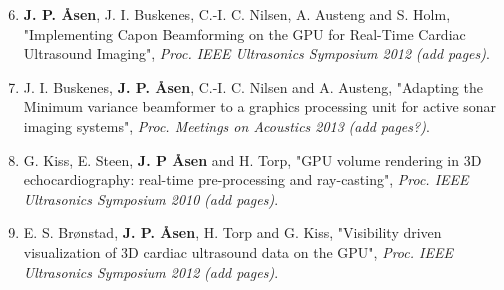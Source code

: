 \documentclass[10pt,b5paper,twoside]{book}
\newcommand\todo[1]{{\textit{\color{red}(#1)}}}
\begin{document}
\begin{enumerate}[VI]
\setcounter{enumi}{5}
\renewcommand\labelenumi{\bfseries\theenumi}

	\item \textbf{J. P. \AA{}sen}, J. I. Buskenes, C.-I. C. Nilsen, A. Austeng and S. Holm, "Implementing Capon Beamforming on the GPU for Real-Time Cardiac Ultrasound Imaging", {\it Proc. IEEE Ultrasonics Symposium 2012} \todo{add pages}.

	\item J. I. Buskenes, \textbf{J. P. \AA{}sen}, C.-I. C. Nilsen and A. Austeng, "Adapting the Minimum variance beamformer to a graphics processing unit for active sonar imaging systems", {\it Proc. Meetings on Acoustics 2013} \todo{add pages?}.
	
	\item G. Kiss, E. Steen, \textbf{J. P \AA{}sen} and H. Torp, "GPU volume rendering in 3D echocardiography: real-time pre-processing and ray-casting", {\it Proc. IEEE Ultrasonics Symposium 2010} \todo{add pages}.


	\item E. S. Br\o{}nstad, \textbf{J. P. \AA{}sen}, H. Torp and G. Kiss, "Visibility driven visualization of 3D cardiac ultrasound data on the GPU", {\it Proc. IEEE Ultrasonics Symposium 2012} \todo{add pages}.
\end{enumerate}

\newpage\thispagestyle{empty}
\pagestyle{fancy}

%

\cleardoublepage
{}
\renewcommand*\contentsname{Contents}
\tableofcontents

\clearpage
\setcounter{page}{1}
\renewcommand{\thepage}{\arabic{page}}

\renewcommand*\thesection{\arabic{section}}

\begin{bibunit}[ieeetr]

\newpage{}
\putbib[bibIntroduction]
\end{bibunit}
\end{document}
